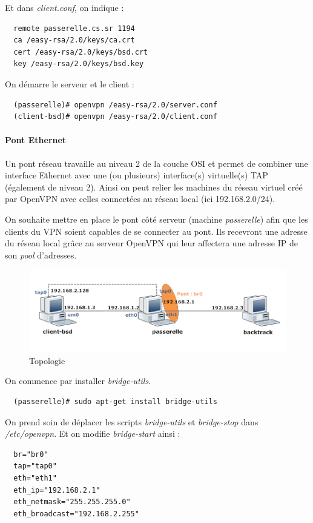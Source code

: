 \documentclass[a4paper]{article}
\begin{document}
Et dans \textit{client.conf}, on indique :
\begin{verbatim}
  remote passerelle.cs.sr 1194
  ca /easy-rsa/2.0/keys/ca.crt
  cert /easy-rsa/2.0/keys/bsd.crt
  key /easy-rsa/2.0/keys/bsd.key
\end{verbatim}

On démarre le serveur et le client :
\begin{verbatim}
  (passerelle)# openvpn /easy-rsa/2.0/server.conf
  (client-bsd)# openvpn /easy-rsa/2.0/client.conf
\end{verbatim}

\paragraph{Pont Ethernet}

Un pont réseau travaille au niveau 2 de la couche OSI et permet de combiner
une interface Ethernet avec une (ou plusieurs) interface(s) virtuelle(s) TAP (également de niveau 2).
Ainsi on peut relier les machines du réseau virtuel créé par OpenVPN avec celles 
connectées au réseau local (ici 192.168.2.0/24). 

On souhaite mettre en place le pont côté serveur (machine \textit{passerelle})
afin que les clients du VPN soient capables de se connecter au pont. Ils recevront
une adresse du réseau local grâce au serveur OpenVPN qui leur affectera une adresse
IP de son \textit{pool} d'adresses.

\begin{figure}[!ht]
	\centering
	\includegraphics[scale=.6]{VPN2.PNG}
	\caption{\label{vpn1} Topologie}
\end{figure}

On commence par installer \textit{bridge-utils}.
\begin{verbatim}
  (passerelle)# sudo apt-get install bridge-utils
\end{verbatim}

On prend soin de déplacer les scripts \textit{bridge-utils} et \textit{bridge-stop}
dans \textit{/etc/openvpn}. Et on modifie \textit{bridge-start} ainsi :
\begin{verbatim}
  br="br0"
  tap="tap0"
  eth="eth1"
  eth_ip="192.168.2.1"
  eth_netmask="255.255.255.0"
  eth_broadcast="192.168.2.255"
\end{verbatim}
\end{document}

